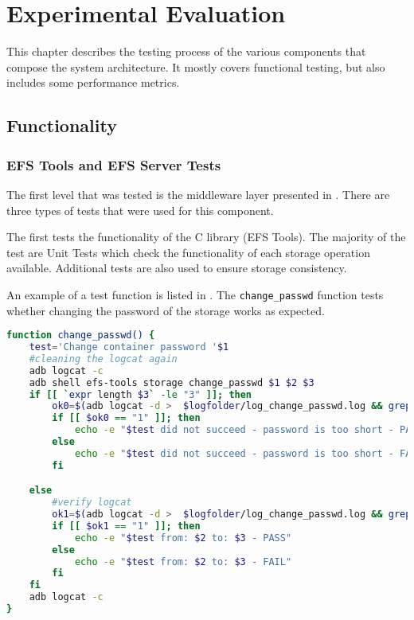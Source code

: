\chapter{Experimental Evaluation}
\label{chapter:eval}

This chapter describes the testing process of the various components that compose the system architecture. It mostly covers functional testing, but also includes some performance metrics.

\section{Functionality}
\label{sec:func-eval}

\subsection{EFS Tools and EFS Server Tests}
\label{sub-sec:efs-tools-server-tests-eval}

The first level that was tested is the middleware layer presented in . There are three types of tests that were used for this component.

The first tests the functionality of the C library (EFS Tools). The majority of the test are Unit Tests which check the functionality of each storage operation available. Additional tests are also used to ensure storage consistency.

An example of a test function is listed in . The \texttt{change_passwd} function tests whether changing the password of the storage works as expected.

\begin{lstlisting}[language=bash, basicstyle=\small, caption=change_passwd test function, label=lst:change-passwd-eval]
function change_passwd() {
    test='Change container password '$1
    #cleaning the logcat again
    adb logcat -c
    adb shell efs-tools storage change_passwd $1 $2 $3
    if [[ `expr length $3` -le "3" ]]; then
        ok0=$(adb logcat -d >  $logfolder/log_change_passwd.log && grep -c 'New passwd too short' $logfolder/log_change_passwd.log)
        if [[ $ok0 == "1" ]]; then
            echo -e "$test did not succeed - password is too short - PASS"
        else
            echo -e "$test did not succeed - password is too short - FAIL"
        fi

    else
        #verify logcat
        ok1=$(adb logcat -d >  $logfolder/log_change_passwd.log && grep -c 'Change passwd successful for '$1' storage' $logfolder/log_change_passwd.log)
        if [[ $ok1 == "1" ]]; then
            echo -e "$test from: $2 to: $3 - PASS"
        else
            echo -e "$test from: $2 to: $3 - FAIL"
        fi
    fi
    adb logcat -c
}
\end{lstlisting}

